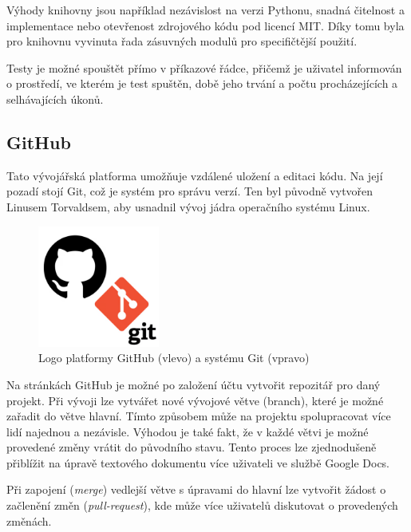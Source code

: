 \documentclass[a4paper,oneside,12pt]{book}
\begin{document}
\hspace{10mm}Výhody knihovny jsou například nezávislost na verzi Pythonu, snadná čitelnost a implementace nebo otevřenost zdrojového kódu pod licencí MIT. Díky tomu byla pro knihovnu vyvinuta řada zásuvných modulů pro specifičtější použití. \cite{Okken2017}

\hspace{10mm}Testy je možné spouštět přímo v příkazové řádce, přičemž je uživatel informován o prostředí, ve kterém je test spuštěn, době jeho trvání a počtu procházejících a selhávajících úkonů.   

\newpage
\subsection{GitHub} \label{github}
Tato vývojářská platforma umožňuje vzdálené uložení a editaci kódu. Na její pozadí stojí Git, což je systém pro správu verzí. Ten byl původně vytvořen Linusem Torvaldsem, aby usnadnil vývoj jádra operačního systému Linux. \cite{Guthals2023}

\begin{figure}[ht] \label{obr10}
\centering
\includegraphics[height=4cm]{pictures/git.png}
\caption{Logo platformy GitHub (vlevo) a systému Git (vpravo) \cite{Guthals2023}}
\label{fig:git}
\end{figure}

\hspace{10mm}Na stránkách GitHub je možné po založení účtu vytvořit repozitář pro daný projekt. Při vývoji lze vytvářet nové vývojové větve (branch), které je možné zařadit do větve hlavní. Tímto způsobem může na projektu spolupracovat více lidí najednou a nezávisle. Výhodou je také fakt, že v každé větvi je možné provedené změny vrátit do původního stavu. Tento proces lze zjednodušeně přiblížit na úpravě textového dokumentu více uživateli ve službě Google Docs. \cite{Guthals2023}

\hspace{10mm}Při zapojení (\textit{merge}) vedlejší větve s úpravami do hlavní lze vytvořit žádost o začlenění změn (\textit{pull-request}), kde může více uživatelů diskutovat o provedených změnách. \cite{Guthals2023}
\end{document}
